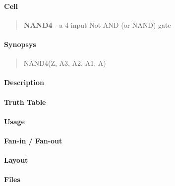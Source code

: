 \label{NAND4}
\paragraph{Cell}
\begin{quote}
    \textbf{NAND4} - a 4-input Not-AND (or NAND) gate
\end{quote}

\paragraph{Synopsys}
\begin{quote}
    NAND4(Z, A3, A2, A1, A)
\end{quote}

\paragraph{Description}

%

\paragraph{Truth Table}
%

\paragraph{Usage}

\paragraph{Fan-in / Fan-out}

\paragraph{Layout}

\paragraph{Files}

